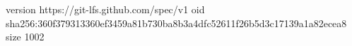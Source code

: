 version https://git-lfs.github.com/spec/v1
oid sha256:360f379313360ef3459a81b730ba8b3a4dfc52611f26b5d3c17139a1a82ecea8
size 1002
